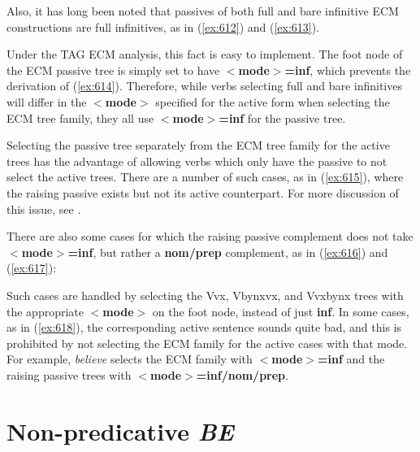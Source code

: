 Also, it has long been noted that passives of both full and bare infinitive 
ECM constructions are full infinitives, as in (\ref{ex:612}) and (\ref{ex:613}). 
 
\beginsentences
{}\label{ex:612} 
\label{ex:613} 
\label{ex:614} 
\endsentences

 
Under the TAG ECM analysis, this fact is easy to implement.  The foot 
node of the ECM passive tree is simply set to have {\bf $<$mode$>$=inf}, 
which prevents the derivation of (\ref{ex:614}).  Therefore, while verbs 
selecting full and bare infinitives will differ in the {\bf $<$mode$>$} 
specified for the active form when selecting the ECM tree family, they 
all use {\bf $<$mode$>$=inf} for the passive tree. 
 
Selecting the passive tree separately from the ECM tree family for the 
active trees has the advantage of allowing verbs which only have the passive to 
not select the active trees.  There are a number of such cases, 
as in (\ref{ex:615}), where 
the raising passive exists but not its active counterpart.  For more 
discussion of this issue, see \cite{kj85}. 
 
\beginsentences
{}\label{ex:615} 
\endsentences

 
There are also some cases for which the raising passive complement does 
not take {\bf $<$mode$>$=inf}, but rather a {\bf nom/prep} complement, 
as in (\ref{ex:616}) and (\ref{ex:617}): 
 
\beginsentences
{}\label{ex:616} 
\label{ex:617} 
\label{ex:618} 
\endsentences

 
Such cases are handled by selecting the Vvx, Vbynxvx, and Vvxbynx trees 
with the appropriate {\bf $<$mode$>$} on the foot node, instead of just 
{\bf inf}.  In some cases, as in (\ref{ex:618}), the corresponding active 
sentence sounds quite bad, and this is prohibited by not selecting the 
ECM family for the active cases with that mode.  For example, {\it believe} 
selects the ECM family with {\bf $<$mode$>$=inf} and the raising passive 
trees with {\bf $<$mode$>$=inf/nom/prep}. 
 
\section{Non-predicative {\it BE}} 
\label{equative-be-xtag-analysis} 
 
